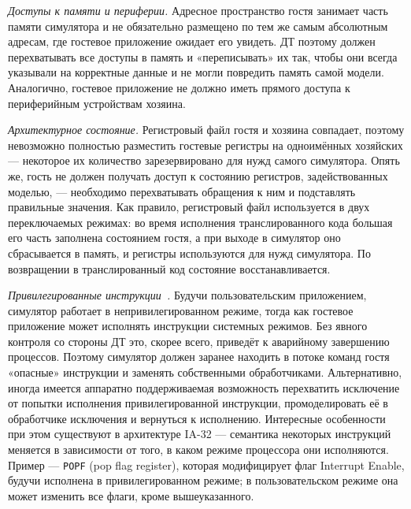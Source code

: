\begin{itemize*}

\item \textit{Доступы к памяти и периферии.} Адресное пространство гостя занимает часть памяти симулятора и не обязательно размещено по тем же самым абсолютным адресам, где гостевое приложение ожидает его увидеть. ДТ поэтому должен перехватывать все доступы в память и «переписывать» их так, чтобы они всегда указывали на корректные данные и не могли повредить память самой модели. Аналогично, гостевое приложение не должно иметь прямого доступа к периферийным устройствам хозяина.

\item \textit{Архитектурное состояние.} Регистровый файл гостя и хозяина совпадает, поэтому невозможно полностью разместить гостевые регистры на одноимённых хозяйских --- некоторое их количество зарезервировано для нужд самого симулятора. Опять же, гость не должен получать доступ к состоянию регистров, задействованных моделью, --- необходимо перехватывать обращения к ним и подставлять правильные значения. Как правило, регистровый файл используется в двух переключаемых режимах: во время исполнения транслированного кода большая его часть заполнена состоянием гостя, а при выходе в симулятор оно сбрасывается в память, и регистры используются для нужд симулятора. По возвращении в транслированный код состояние восстанавливается. 

\item\textit{Привилегированные инструкции~\cite{popek}.} Будучи пользовательским приложением, симулятор работает в непривилегированном режиме, тогда как гостевое приложение может исполнять инструкции системных режимов. Без явного контроля со стороны ДТ это, скорее всего, приведёт к аварийному завершению процессов. Поэтому симулятор должен заранее находить в потоке команд гостя «опасные» инструкции и заменять собственными обработчиками. Альтернативно, иногда имеется аппаратно поддерживаемая возможность перехватить исключение от попытки исполнения привилегированной инструкции, промоделировать её в обработчике исключения и вернуться к исполнению. Интересные особенности при этом существуют в архитектуре IA-32 --- семантика некоторых инструкций меняется в зависимости от того, в каком режиме процессора они исполняются. Пример --- \texttt{POPF} (\abbr pop flag register), которая модифицирует флаг Interrupt Enable, будучи исполнена в привилегированном режиме; в пользовательском режиме она может изменить все флаги, кроме вышеуказанного.

\end{itemize*}


